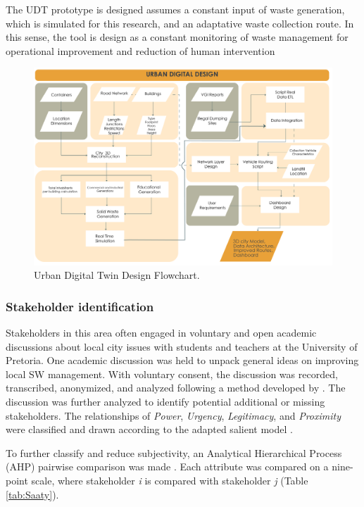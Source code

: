 \documentclass[authoryear,preprint,review,11pt,doubleblind]{elsarticle}
\begin{document}
    The UDT prototype is designed assumes a constant input of waste generation, which is simulated for this research, and an adaptative waste collection route. In this sense, the tool is design as a constant monitoring of waste management for operational improvement and reduction of human intervention
    
    \begin{figure}[!h]
    \centering
        \includegraphics[width=1.2\linewidth]{Figures/Phase III_.png}
        \caption{Urban Digital Twin Design Flowchart.}
        \label{fig:flowchart}
    \end{figure}

\subsubsection{Stakeholder identification} \label{subsec:stakeholderIdent}
   Stakeholders in this area often engaged in voluntary and open academic discussions about local city issues with students and teachers at the University of Pretoria. One academic discussion was held to unpack general ideas on improving local SW management. With voluntary consent, the discussion was recorded, transcribed, anonymized, and analyzed following a method developed by \citet{Radford2022}. The discussion was further analyzed to identify potential additional or missing stakeholders. The relationships of \textit{Power}, \textit{Urgency}, \textit{Legitimacy}, and \textit{Proximity} were classified and drawn according to the adapted salient model \citep{Mitchell1997, Shafique2022}.

    To further classify and reduce subjectivity, an Analytical Hierarchical Process (AHP) pairwise comparison was made \citep{Saaty1987, Saaty1990}. Each attribute was compared on a nine-point scale, where stakeholder \textit{i} is compared with stakeholder \textit{j} (Table \ref{tab:Saaty}).
    
\end{document}
